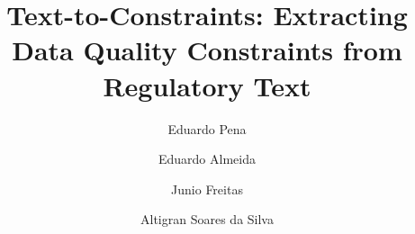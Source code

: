\documentclass[sigconf]{acmart}
\begin{document}
\title{Text-to-Constraints: Extracting Data Quality Constraints from Regulatory Text}

\author{Eduardo Pena}

\author{Eduardo Almeida}

\author{Junio Freitas}

\author{Altigran Soares da Silva}




\begin{abstract}

\end{abstract}

\maketitle

 
 
 
 
 
 
 
 
 
% 
 
 




%
\end{document}
